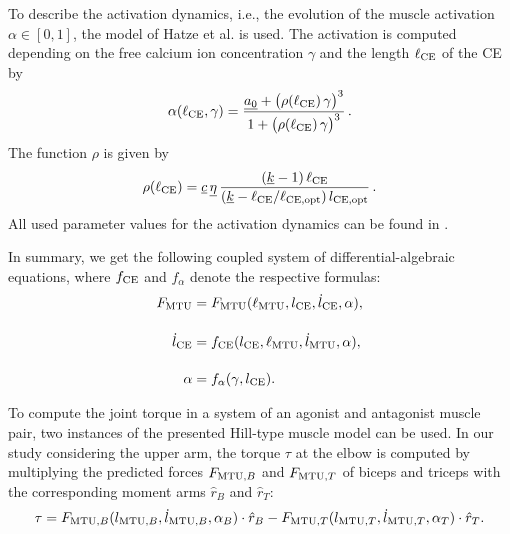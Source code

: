 To describe the activation dynamics, i.e., the evolution of the muscle activation ${\alpha \in [0,1]}$, the model of Hatze et al. \cite{Hatze1977} is used.
The activation is computed depending on the free calcium ion concentration $\gamma$ and the length $\ell_{\text{CE}}$ of the CE by
\begin{equation*}
  \begin{array}{lll}
    \alpha(\ell_{\text{CE}},\gamma) = \displaystyle\frac{\displaystyle{\underline{a_0} + \big(\rho(\ell_{\text{CE}})\,\gamma\big)^3}}{\displaystyle{1 + \big(\rho(\ell_{\text{CE}})\,\gamma\big)^3}}\,.
  \end{array}
\end{equation*}
The function $\rho$ is given by
\begin{equation*}
  \begin{array}{lll}
    \rho(\ell_{\text{CE}}) = \underline{c}\,\underline{\eta}\,\displaystyle\frac{\displaystyle{(\underline{k}-1)\,\ell_{\text{CE}}}}{\displaystyle{(\underline{k} - \ell_{\text{CE}}/\ell_\text{CE,opt})\,l_\text{CE,opt}}}\,.
  \end{array}
\end{equation*}
All used parameter values for the activation dynamics can be found in \cite{Bayer2017}.

In summary, we get the following coupled system of differential-algebraic equations, where $f_{\text{CE}}$ and $f_\alpha$ denote the respective formulas:
\begin{align}
  F_{\text{MTU}} &= F_{\text{MTU}}(\ell_{\text{MTU}},l_{\text{CE}},\dot{l}_{\text{CE}},\alpha),      \label{eq:hill_type1} \\[4mm]
  \dot{l}_{\text{CE}} &= f_{\text{CE}}(l_{\text{CE}},\ell_{\text{MTU}},\dot{l}_{\text{MTU}},\alpha), \label{eq:hill_type2}\\[4mm]
  \alpha &= f_\alpha(\gamma, l_{\text{CE}}).                      \label{eq:hill_type3}
\end{align}

To compute the joint torque in a system of an agonist and antagonist muscle pair, two instances of the presented Hill-type muscle model can be used. In our study considering the upper arm, the torque $\tau$ at the elbow is computed by multiplying the predicted forces $F_{\text{MTU},B}$ and $F_{\text{MTU},T}$ of biceps and triceps with the corresponding moment arms $\hat{r}_B$ and $\hat{r}_T$:
\begin{equation}\label{eq:muscle_torque}
  \begin{array}{lll}
    \tau = F_{\text{MTU},B}(l_{\text{MTU},B},\dot{l}_{\text{MTU},B},\alpha_B) \cdot \hat{r}_B - F_{\text{MTU},T}(l_{\text{MTU},T},\dot{l}_{\text{MTU},T},\alpha_T) \cdot \hat{r}_T.
  \end{array}
\end{equation}


